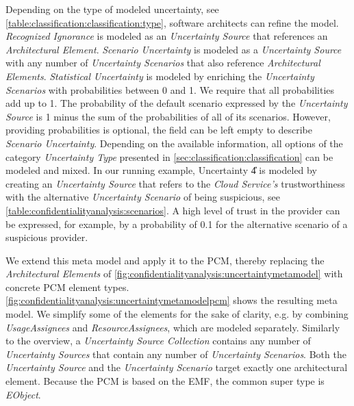 Depending on the type of modeled uncertainty, see \autoref{table:classification:classification:type}, software architects can refine the model.
\emph{Recognized Ignorance} is modeled as an \emph{Uncertainty Source} that references an \emph{Architectural Element}.
\emph{Scenario Uncertainty} is modeled as a \emph{Uncertainty Source} with any number of \emph{Uncertainty Scenarios} that also reference \emph{Architectural Elements}.
\emph{Statistical Uncertainty} is modeled by enriching the \emph{Uncertainty Scenarios} with probabilities between 0 and 1.
We require that all probabilities add up to 1.
The probability of the default scenario expressed by the \emph{Uncertainty Source} is 1 minus the sum of the probabilities of all of its scenarios.
However, providing probabilities is optional, the field can be left empty to describe \emph{Scenario Uncertainty}.
Depending on the available information, all options of the category \emph{Uncertainty Type} presented in \autoref{sec:classification:classification} can be modeled and mixed.
In our running example, Uncertainty \U{4} is modeled by creating an \emph{Uncertainty Source} that refers to the \emph{Cloud Service's} trustworthiness with the alternative \emph{Uncertainty Scenario} of being suspicious, see \autoref{table:confidentialityanalysis:scenarios}.
A high level of trust in the provider can be expressed, for example, by a probability of 0.1 for the alternative scenario of a suspicious provider.

We extend this meta model and apply it to the \ac{PCM}, thereby replacing the \emph{Architectural Elements} of \autoref{fig:confidentialityanalysis:uncertaintymetamodel} with concrete \ac{PCM} element types.
\autoref{fig:confidentialityanalysis:uncertaintymetamodelpcm} shows the resulting meta model.
We simplify some of the elements for the sake of clarity, e.g. by combining \emph{UsageAssignees} and \emph{ResourceAssignees}, which are modeled separately.
Similarly to the overview, a \emph{Uncertainty Source Collection} contains any number of \emph{Uncertainty Sources} that contain any number of \emph{Uncertainty Scenarios}.
Both the \emph{Uncertainty Source} and the \emph{Uncertainty Scenario} target exactly one architectural element.
Because the \ac{PCM} is based on the \acf{EMF}, the common super type is \emph{EObject}.

